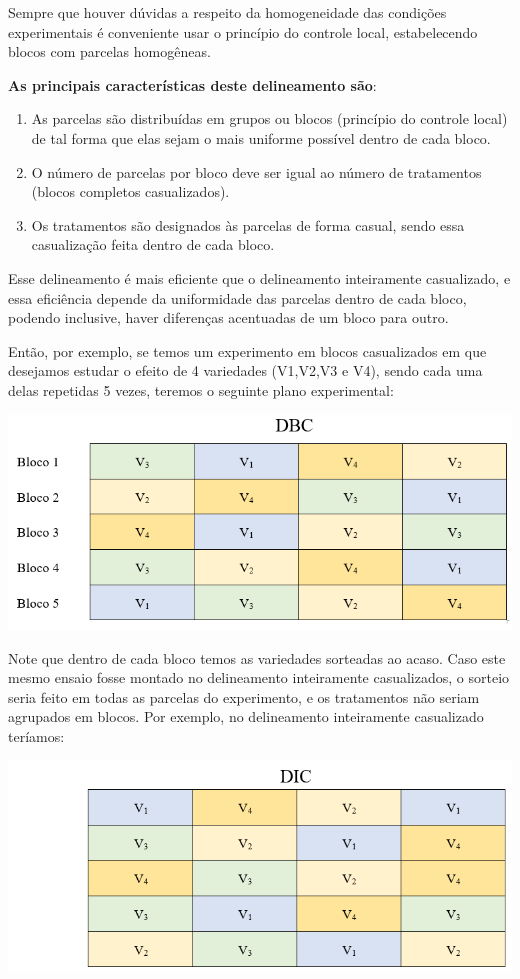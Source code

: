 \documentclass[
]{book}
\begin{document}
Sempre que houver dúvidas a respeito da homogeneidade das condições experimentais é conveniente usar o princípio do controle local, estabelecendo blocos com parcelas homogêneas.

\textbf{As principais características deste delineamento são}:

\begin{enumerate}
\def\labelenumi{\arabic{enumi}.}
\item
  As parcelas são distribuídas em grupos ou blocos (princípio do controle local) de tal forma que elas sejam o mais uniforme possível dentro de cada bloco.
\item
  O número de parcelas por bloco deve ser igual ao número de tratamentos (blocos completos casualizados).
\item
  Os tratamentos são designados às parcelas de forma casual, sendo essa casualização feita dentro de cada bloco.
\end{enumerate}

Esse delineamento é mais eficiente que o delineamento inteiramente casualizado, e essa eficiência depende da uniformidade das parcelas dentro de cada bloco, podendo inclusive, haver diferenças acentuadas de um bloco para outro.

Então, por exemplo, se temos um experimento em blocos casualizados em que desejamos estudar o efeito de 4 variedades (V1,V2,V3 e V4), sendo cada uma delas repetidas 5 vezes, teremos o seguinte plano experimental:

\includegraphics{DBC_d.png}

Note que dentro de cada bloco temos as variedades sorteadas ao acaso. Caso este mesmo ensaio fosse montado no delineamento inteiramente casualizados, o sorteio seria feito em todas as parcelas do experimento, e os tratamentos não seriam agrupados em blocos. Por exemplo, no delineamento inteiramente casualizado teríamos:

\includegraphics{DIC_d.png}
\end{document}
